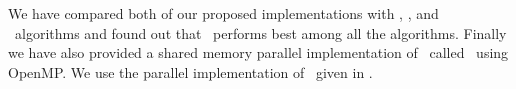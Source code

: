 We have compared both of our proposed implementations with \lrpc, \run, and \arun\ algorithms and found out that \aremsp\ performs best among all the algorithms.
Finally we have also provided a shared memory parallel implementation of \remsp\ called \aremsp\ using OpenMP.
We use the parallel implementation of \remsp\ given in \cite{Patwary2012_PARemSP}. 
